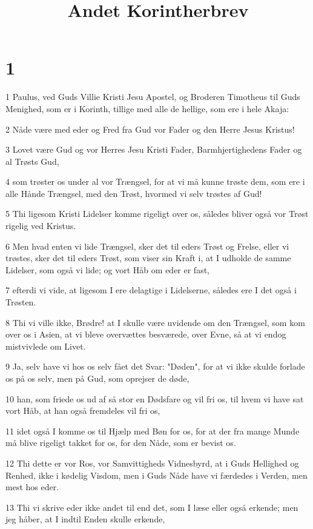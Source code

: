 

\title{Andet Korintherbrev}


\chapter{1}

\par 1 Paulus, ved Guds Villie Kristi Jesu Apostel, og Broderen Timotheus til Guds Menighed, som er i Korinth, tillige med alle de hellige, som ere i hele Akaja:
\par 2 Nåde være med eder og Fred fra Gud vor Fader og den Herre Jesus Kristus!
\par 3 Lovet være Gud og vor Herres Jesu Kristi Fader, Barmhjertighedens Fader og al Trøsts Gud,
\par 4 som trøster os under al vor Trængsel, for at vi må kunne trøste dem, som ere i alle Hånde Trængsel, med den Trøst, hvormed vi selv trøstes af Gud!
\par 5 Thi ligesom Kristi Lidelser komme rigeligt over os, således bliver også vor Trøst rigelig ved Kristus.
\par 6 Men hvad enten vi lide Trængsel, sker det til eders Trøst og Frelse, eller vi trøstes, sker det til eders Trøst, som viser sin Kraft i, at I udholde de samme Lidelser, som også vi lide; og vort Håb om eder er fast,
\par 7 efterdi vi vide, at ligesom I ere delagtige i Lidelserne, således ere I det også i Trøsten.
\par 8 Thi vi ville ikke, Brødre! at I skulle være uvidende om den Trængsel, som kom over os i Asien, at vi bleve overvættes besværede, over Evne, så at vi endog mistvivlede om Livet.
\par 9 Ja, selv have vi hos os selv fået det Svar: "Døden", for at vi ikke skulde forlade os på os selv, men på Gud, som oprejser de døde,
\par 10 han, som friede os ud af så stor en Dødsfare og vil fri os, til hvem vi have sat vort Håb, at han også fremdeles vil fri os,
\par 11 idet også I komme os til Hjælp med Bøn for os, for at der fra mange Munde må blive rigeligt takket for os, for den Nåde, som er bevist os.
\par 12 Thi dette er vor Ros, vor Samvittigheds Vidnesbyrd, at i Guds Hellighed og Renhed, ikke i kødelig Visdom, men i Guds Nåde have vi færdedes i Verden, men mest hos eder.
\par 13 Thi vi skrive eder ikke andet til end det, som I læse eller også erkende; men jeg håber, at I indtil Enden skulle erkende,
